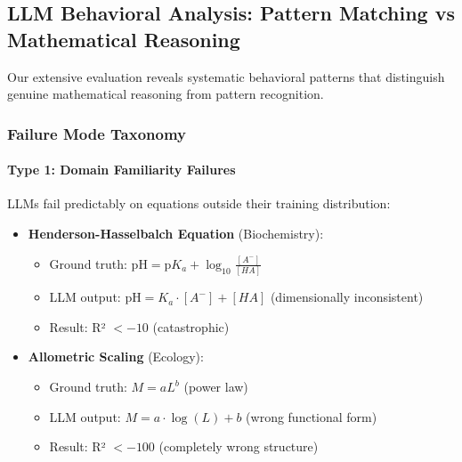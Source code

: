 
\subsection{LLM Behavioral Analysis: Pattern Matching vs Mathematical Reasoning}
\label{sec:llm_behavior}

Our extensive evaluation reveals systematic behavioral patterns that distinguish genuine mathematical reasoning from pattern recognition.

\subsubsection{Failure Mode Taxonomy}

\paragraph{Type 1: Domain Familiarity Failures}

LLMs fail predictably on equations outside their training distribution:

\begin{itemize}
    \item \textbf{Henderson-Hasselbalch Equation} (Biochemistry):
    \begin{itemize}
        \item Ground truth: $\text{pH} = \text{p}K_a + \log_{10}\frac{[A^-]}{[HA]}$
        \item LLM output: $\text{pH} = K_a \cdot [A^-] + [HA]$ (dimensionally inconsistent)
        \item Result: R² $< -10$ (catastrophic)
    \end{itemize}

    \item \textbf{Allometric Scaling} (Ecology):
    \begin{itemize}
        \item Ground truth: $M = aL^b$ (power law)
        \item LLM output: $M = a \cdot \log(L) + b$ (wrong functional form)
        \item Result: R² $< -100$ (completely wrong structure)
    \end{itemize}
\end{itemize}

